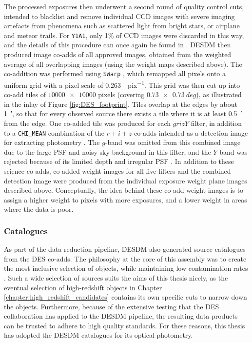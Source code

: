 The processed exposures then underwent a second round of quality control cuts, intended to blacklist and remove individual CCD images with severe imaging artefacts from phenomena such as scattered light from bright stars, or airplane and meteor trails. For \texttt{Y1A1}, only 1\% of CCD images {were} discarded in this way, and the details of this procedure can once again be found in \cite{2018ApJS..235...33D}. DESDM then produced image co-adds of all approved images, obtained from the weighted average of all overlapping images (using the weight maps described above). The co-addition was performed using \texttt{SWarp} \citep{2002ASPC..281..228B,2010ascl.soft10068B}, which remapped all pixels onto a uniform grid with a pixel scale of \SI{0.263}{\arcsec.pix^{-1}}. This grid was then cut up into co-add tiles of $\num{10 000 x 10 000}$ pixels (covering $\SI[product-units = repeat]{0.73 x 0.73}{deg}$), as illustrated in the inlay of Figure \ref{fig:DES_footprint}. Tiles overlap at the edges by about \SI{1}{\arcmin}, so that for every observed source there exists a tile where it is at least \SI{0.5}{\arcmin} from the edge. One co-added tile was produced for each $grizY$ filter, in addition to a  \texttt{CHI\_MEAN} combination of the $r+i+z$ co-adds intended as a detection image for extracting photometry  \citep{1999AJ....117...68S,2010ascl.soft10068B,2018ApJS..235...33D}. The $g$-band was omitted from this combined image due to the large PSF and noisy sky background in this filter, and the $Y$-band was rejected because of its limited depth and irregular PSF \citep{2018PASP..130g4501M}. In addition to these science co-adds, co-added weight images for all five filters and the combined detection image were produced from the individual exposure weight plane images described above. Conceptually, the idea behind these co-add weight images is to assign a higher weight to pixels with more exposures, and a lower weight in areas where the data is poor. \par 


\subsubsection{Catalogues}\label{subsubsection:des_catalogues}
As part of the data reduction pipeline, DESDM also generated source catalogues from the DES co-adds. The philosophy at the core of this assembly was to create the most inclusive selection of objects, while maintaining low contamination rates \citep{2018ApJS..235...33D}. Such a wide selection of sources suits the aims of this thesis nicely, as the eventual selection of high-redshift objects in Chapter \ref{chapter:high_redshift_candidates} contains its own specific cuts to narrow down the objects. Furthermore, because of the extensive testing that the DES collaboration has applied to the DESDM pipeline, the resulting data products can be trusted to adhere to high quality standards. For these reasons, this thesis has adopted the DESDM catalogues for its optical photometry. \par 

